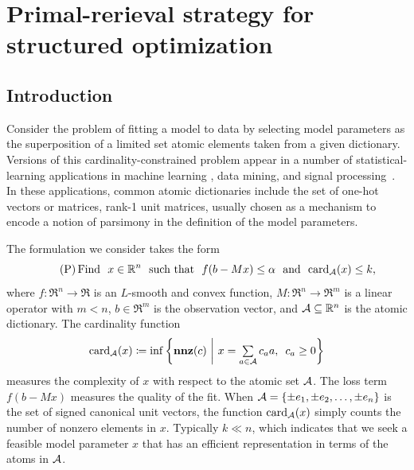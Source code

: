 \chapter{Primal-rerieval strategy for structured optimization}
\label{ch:App-Primal-Retrieval}

\section{Introduction} \label{sec:4-1}

Consider the problem of fitting a model to data by selecting model parameters as the superposition of a limited set atomic elements taken from a given dictionary. Versions of this cardinality-constrained problem appear in a number of statistical-learning applications in machine learning \cite{tibshirani1996regression,yul06,Meinshausen06,aep08}, data mining, and signal processing~\cite{candes:2013}. In these applications, common atomic dictionaries include the set of one-hot vectors or matrices, rank-1 unit matrices, usually chosen as a mechanism to encode a notion of parsimony in the definition of the model parameters.

The formulation we consider takes the form
\begin{equation} \label{eq:main_prob} \tag{P}
    \mathop{\hbox{\rm Find}}\enspace x\in\mathbb{R}^n \enspace\mathop{\hbox{\rm such that}}\enspace f(b - Mx) \leq \alpha \enspace\mathop{\hbox{\rm and}}\enspace \operatorname{card}_{\mathcal{A}}(x) \leq k,
\end{equation}
where $f:\Re^n\to\Re$ is an $L$-smooth and convex function, $M: \Re^n \to \Re^m$ is a linear operator with $m < n$, $b \in \Re^m$ is the observation vector, and $\mathcal{A} \subseteq \mathbb{R}^n$ is the atomic dictionary. The cardinality function 
\begin{equation}\label{eq-card-fcn}
    \operatorname{card}_{\mathcal{A}}(x) \coloneqq \inf\left\{ \mathbf{nnz}(c) ~\bigg\vert~ x = \textstyle\sum\limits_{a \in \mathcal{A}} c_a a, \enspace c_a \geq 0\right\}
\end{equation}
measures the complexity of $x$ with respect to the atomic set $\mathcal{A}$.  The loss term $f(b - Mx)$ measures the quality of the fit. When $\mathcal{A} = \{ \pm e_1,\pm e_2, \ldots,\pm e_n \}$ is the set of signed canonical unit vectors, the function $\operatorname{card}_{\mathcal{A}}(x)$ simply counts the number of nonzero elements in $x$. Typically $k\ll n$, which indicates that we seek a feasible model parameter $x$ that has an efficient representation in terms of the atoms in $\mathcal{A}$.

